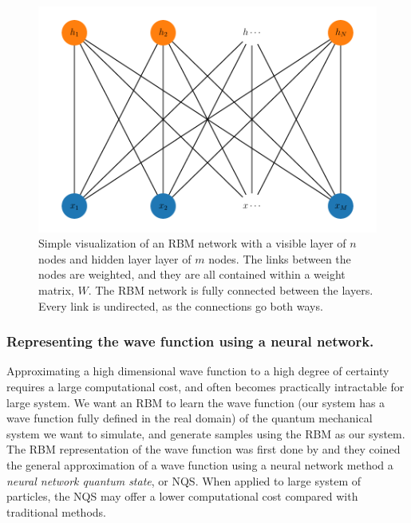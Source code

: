 \begin{figure}[H]
\begin{center}\includegraphics[scale=0.8]{latex/latex-report/Images/rbm_visualize.pdf}
\end{center}
\caption{Simple visualization of an RBM network with a visible layer of $n$ nodes and hidden layer layer of $m$ nodes. The links between the nodes are weighted, and they are all contained within a weight matrix, $W$. The RBM network is fully connected between the layers. Every link is undirected, as the connections go both ways.}
\label{fig:vis_RBM}
\end{figure}

\subsubsection{Representing the wave function using a neural network.}
Approximating a high dimensional wave function to a high degree of certainty requires a large computational cost, and often becomes practically intractable for large system. We want an RBM to learn the wave function (our system has a wave function fully defined in the real domain) of the quantum mechanical system we want to simulate, and generate samples using the RBM as our system. The RBM representation of the wave function was first done by \citep{Carleo_2017} and they coined the general approximation of a wave function using a neural network method a \textit{neural network quantum state}, or NQS. When applied to large system of particles, the NQS may offer a lower computational cost compared with traditional methods. %

